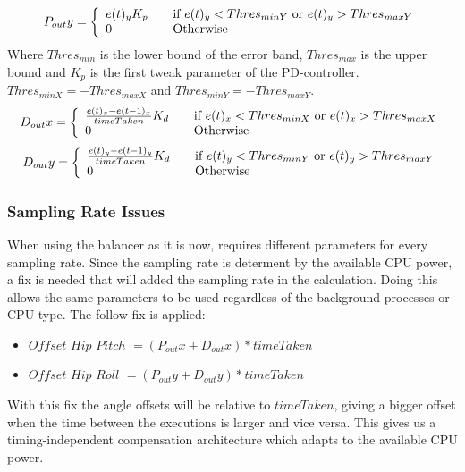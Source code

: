 \documentclass[a4paper]{article}
\begin{document}
\[
  P_{out}y = \left\{ 
  \begin{array}{l l}
      e(t)_yK_p& \quad \text{if $e(t)_y < Thres_{min Y}$ or $e(t)_y > Thres_{max Y}$}\\ 
     0& \quad \text{Otherwise}\\
  \end{array} \right.
\]
Where $Thres_{min}$ is the lower bound of the error band, $Thres_{max}$ is the upper bound
and $K_p$ is the  first tweak parameter of the PD-controller.\\
$Thres_{min X} = -Thres_{max X}$ and
$Thres_{min Y} = -Thres_{max Y}$.
\[
  D_{out}x = \left\{ 
  \begin{array}{l l}
      \frac{e(t)_x - e(t-1)_x}{timeTaken}K_d& \quad \text{if $e(t)_x < Thres_{min X}$  or $e(t)_x > Thres_{max X}$}\\ 
     0& \quad \text{Otherwise}\\
  \end{array} \right.
\]
\[
  D_{out}y = \left\{ 
  \begin{array}{l l}
     \frac{ e(t)_y - e(t-1)_y}{timeTaken}K_d& \quad \text{if $e(t)_y < Thres_{min Y}$ or $e(t)_y > Thres_{max Y}$}\\ 
     0& \quad \text{Otherwise}\\
  \end{array} \right.
\]

\subsubsection{Sampling Rate Issues}

When using the balancer as it is now, requires different parameters for every sampling rate.
Since the sampling rate is determent by the available CPU power, a fix is needed that will added the sampling rate in the calculation.
Doing this allows the same parameters to be used regardless of the background processes or CPU type.
The follow fix is applied:
\begin{itemize}
	\item $Offset$ $Hip$ $Pitch$ $= (P_{out}x + D_{out}x) * timeTaken $ 
	\item $Offset$ $Hip$ $Roll$ $=  (P_{out}y + D_{out}y) * timeTaken$ 
\end{itemize}
With this fix the angle offsets will be relative to $timeTaken$, giving a bigger offset when the time between the executions is larger and vice versa. This gives us a timing-independent compensation architecture which adapts to the available CPU power.
\end{document}
